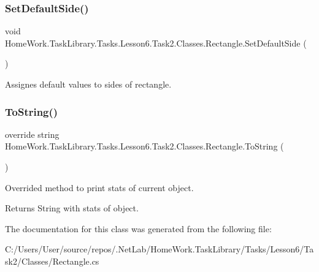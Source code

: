 \subsubsection{\texorpdfstring{SetDefaultSide()}{SetDefaultSide()}}
{\footnotesize\ttfamily void Home\+Work.\+Task\+Library.\+Tasks.\+Lesson6.\+Task2.\+Classes.\+Rectangle.\+Set\+Default\+Side (\begin{DoxyParamCaption}{ }\end{DoxyParamCaption})\hspace{0.3cm}{\ttfamily [private]}}



Assignes default values to sides of rectangle. 

\mbox{\label{class_home_work_1_1_task_library_1_1_tasks_1_1_lesson6_1_1_task2_1_1_classes_1_1_rectangle_aa1bfb66cf596b3a1f51f14f0862446e6}} 
\subsubsection{\texorpdfstring{ToString()}{ToString()}}
{\footnotesize\ttfamily override string Home\+Work.\+Task\+Library.\+Tasks.\+Lesson6.\+Task2.\+Classes.\+Rectangle.\+To\+String (\begin{DoxyParamCaption}{ }\end{DoxyParamCaption})}



Overrided method to print stats of current object. 

\begin{DoxyReturn}{Returns}
String with stats of object.
\end{DoxyReturn}


The documentation for this class was generated from the following file\+:\begin{DoxyCompactItemize}
\item 
C\+:/\+Users/\+User/source/repos/.\+Net\+Lab/\+Home\+Work.\+Task\+Library/\+Tasks/\+Lesson6/\+Task2/\+Classes/Rectangle.\+cs\end{DoxyCompactItemize}
